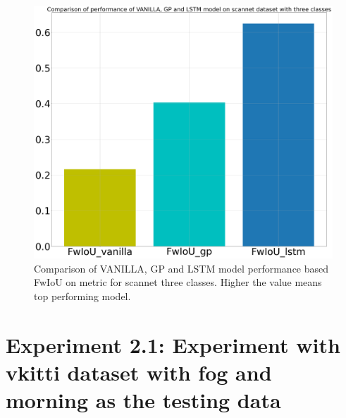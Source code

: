 	\begin{figure}
		\centering
		\includegraphics[width=12cm]{images/three_classes_FwIoU.png}
		\caption{Comparison of VANILLA, GP and LSTM model performance based  FwIoU on metric for scannet three classes. Higher the value means top performing model.}
		\label{fig:performance_metric_three_classes_unet}
	\end{figure}

	\newpage
	\newpage
	
	\section{Experiment 2.1: Experiment with vkitti dataset with fog and morning as the testing data}
	
